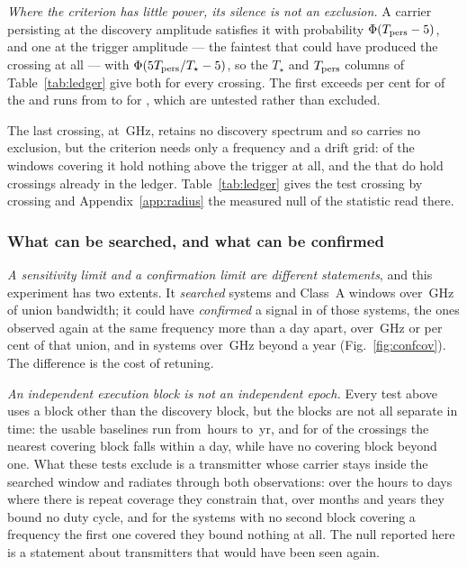 \emph{Where the criterion has little power, its silence is not an exclusion.}
A carrier persisting at the discovery amplitude satisfies it with probability
$\Phi(T_{\rm pers}-5)$, and one at the trigger amplitude --- the faintest that
could have produced the crossing at all --- with
$\Phi(5T_{\rm pers}/T_\star-5)$, so the $T_\star$ and $T_{\rm pers}$ columns of
Table~\ref{tab:ledger} give both for every crossing. The first exceeds
\RcPowerLevel{} per cent for \RcNPowerHi{} of the \RcNExcl{} and runs from
\RcPowerMin{} to \RcPowerLoHi{} for \RcPowerLoList, which are untested
rather than excluded.

The last crossing, \RcUntStar{} at \RcUntFreq\,GHz, retains no discovery
spectrum and so carries no exclusion, but the criterion needs only a frequency
and a drift grid: \CtCritNEmpty{} of the \CtCritNCov{} windows covering it
hold nothing above the trigger at all, and the \CtCritNExc{} that do hold
crossings already in the ledger. Table~\ref{tab:ledger} gives the test
crossing by crossing and Appendix~\ref{app:radius} the measured null of the
statistic read there.

\subsubsection{What can be searched, and what can be confirmed}
\label{sec:confirmability}

\emph{A sensitivity limit and a confirmation limit are different statements},
and this experiment has two extents. It \emph{searched} \RcSearchSys{} systems
and \RcSearchWin{} Class~A windows over \CvUnionA\,GHz of union bandwidth; it
could have \emph{confirmed} a signal in \RcConfSysDay{} of those systems, the
ones observed again at the same frequency more than a day apart, over
\CvConfGHzDay\,GHz or \CvConfPctDay{} per cent of that union, and in
\RcConfSysYr{} systems over \CvConfGHzYr\,GHz beyond a year
(Fig.~\ref{fig:confcov}). The difference is the cost of retuning.

\emph{An independent execution block is not an independent epoch.} Every test
above uses a block other than the discovery block, but the blocks are not all
separate in time: the usable baselines run from \RcSepMinH\,hours to
\RcSepMaxYr\,yr, and for \RcNSepSameDay{} of the \RcNExclPoss{} crossings the
nearest covering block falls within a day, while \CtNHourOnly{} have no
covering block beyond one. What these tests exclude is a transmitter whose
carrier stays inside the searched window and radiates through both
observations: over the hours to days where there is repeat coverage they
constrain that, over months and years they bound no duty cycle, and for the
\RcNoRepSysAll{} systems with no second block covering a frequency the first
one covered they bound nothing at all. The null reported here is a statement
about transmitters that would have been seen again.

